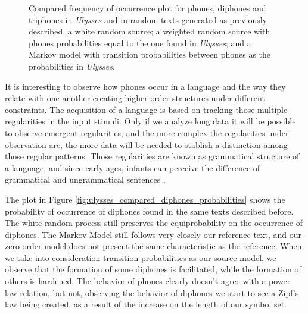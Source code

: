 \begin{figure}
\begin{tabular}{cc}
\end{tabular}
\caption{Compared frequency of occurrence plot for phones, diphones and triphones in \textit{Ulysses} and in random texts generated as previously described, a white random source; a weighted random source with phones probabilities equal to the one found in \textit{Ulysses}; and a Markov model with transition probabilities between phones as the probabilities in \textit{Ulysses}.}
\label{fig:ulysses_compared_nphones_probabilities}
\end{figure}


It is interesting to observe how phones occur in a language and the way they relate with one another
creating higher order structures under different constraints. The acquisition of a language is 
based on tracking those multiple regularities in the input stimuli. Only if we analyze long data
it will be possible to observe emergent regularities, and the more complex the regularities under
observation are, the more data will be needed to stablish a distinction among those regular patterns.
Those regularities are known as grammatical structure of a language, and since early ages, 
infants can perceive the difference of grammatical and ungrammatical sentences \citep{Saffran2003}.


The plot in Figure \ref{fig:ulysses_compared_diphones_probabilities} 
shows the probability of occurrence of diphones found in the same texts described before.
The white random process still preserves the equiprobability on the occurrence of diphones.
The Markov Model still follows very closely our reference text, and our zero order model 
does not present the same characteristic as the reference. 
When we take into consideration transition probabilities as our source model, 
we observe that the formation of some diphones is facilitated, while the formation of others 
is hardened. The behavior of phones clearly doesn't agree with a power law relation, but
not, observing the behavior of diphones we start to see a Zipf's law being created, as a result
of the increase on the length of our symbol set.

